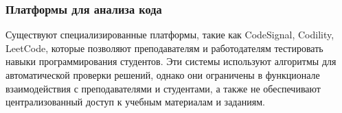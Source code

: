 \subsubsection{Платформы для анализа кода}
Существуют специализированные платформы, такие как CodeSignal, Codility, LeetCode, которые позволяют преподавателям и работодателям тестировать навыки программирования студентов. Эти системы используют алгоритмы для автоматической проверки решений, однако они ограничены в функционале взаимодействия с преподавателями и студентами, а также не обеспечивают централизованный доступ к учебным материалам и заданиям.